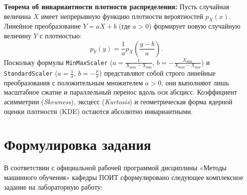 \documentclass[14pt,a4paper]{extarticle}
\begin{document}
\textbf{Теорема об инвариантности плотности распределения:} Пусть случайная величина $X$ имеет непрерывную функцию плотности вероятностей $p_X(x)$. Линейное преобразование $Y = aX + b$ (где $a > 0$) формирует новую случайную величину $Y$ с плотностью:
\begin{equation}
    p_Y(y) = \frac{1}{a} p_X\left(\frac{y - b}{a}\right).
\end{equation}
Поскольку формулы \texttt{MinMaxScaler} ($a = \frac{1}{X_{\max}-X_{\min}}$, $b = -\frac{X_{\min}}{X_{\max}-X_{\min}}$) и \texttt{StandardScaler} ($a = \frac{1}{\sigma}$, $b = -\frac{\mu}{\sigma}$) представляют собой строго линейные преобразования с положительным множителем $a > 0$, они выполняют лишь масштабное сжатие и параллельный перенос вдоль оси абсцисс. Коэффициент асимметрии (\textit{Skewness}), эксцесс (\textit{Kurtosis}) и геометрическая форма ядерной оценки плотности (KDE) остаются абсолютно инвариантными.

\clearpage
\section{Формулировка задания}

В соответствии с официальной рабочей программой дисциплины «Методы машинного обучения» кафедры ПОИТ сформулировано следующее комплексное задание на лабораторную работу:
\end{document}
